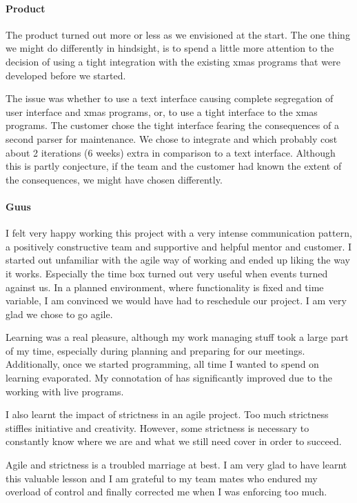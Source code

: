 \paragraph{Product} The product turned out more or less as we envisioned at the start. The one
thing we might do differently in hindsight, is to spend a little more attention to the decision
of using a tight integration with the existing xmas programs that were developed before we started.

The issue was whether to use a text interface causing complete segregation of user interface and
xmas programs, or, to use a tight interface to the xmas programs. The customer chose the tight 
interface fearing the consequences of a second parser for maintenance. We chose to integrate
\qml and \cpp which probably cost about 2 iterations (6 weeks) extra in comparison to a text
interface. Although this is partly conjecture, if the team and the customer had known the extent 
of the consequences, we might have chosen differently.

\paragraph{Guus} I felt very happy working this project with a very intense communication pattern,
a positively constructive team and supportive and helpful mentor and customer. I started out 
unfamiliar with the agile way of working and ended up liking the way it works. 
Especially the time box turned out very useful when events 
turned against us. In a planned environment, where functionality is fixed and time variable, I 
am convinced we would have had to reschedule our project. I am very glad we chose to go agile.

Learning \cpp was a real pleasure, although my work managing stuff took a large part of my time,
especially during planning and preparing for our meetings. Additionally, once we started programming,
all time I wanted to spend on learning \cpp evaporated. My connotation of \cpp has significantly improved
due to the working with live \cpp programs.

I also learnt the impact of strictness in an agile project. Too much strictness stiffles initiative 
and creativity. However, some strictness is necessary to constantly know where we are and what we 
still need cover in order to succeed.

Agile and strictness is a troubled marriage at best. I am very glad to have learnt this valuable lesson and
I am grateful to my team mates who endured my overload of control and finally corrected me when I was 
enforcing too much.

